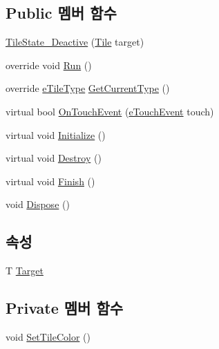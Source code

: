 \subsection*{Public 멤버 함수}
\begin{DoxyCompactItemize}
\item 
\hyperlink{class_tile_1_1_tile_state___deactive_af238bc1bded3aea43c93b71f4428d8e5}{Tile\+State\+\_\+\+Deactive} (\hyperlink{class_tile}{Tile} target)
\item 
override void \hyperlink{class_tile_1_1_tile_state___deactive_a806c5dbc5eb43903ad41d448f3d25c61}{Run} ()
\item 
override \hyperlink{_tile_8cs_a271bc07be325bca511bcb747e0ff2fda}{e\+Tile\+Type} \hyperlink{class_tile_1_1_tile_state___deactive_a1aed8e0336e11dcb55cb598119c53eda}{Get\+Current\+Type} ()
\item 
virtual bool \hyperlink{class_tile_1_1_tile_state_a8687f7cb0e2c1a436c5ac395f4f6d07a}{On\+Touch\+Event} (\hyperlink{_touch_manager_8cs_ae33e321a424fe84ba8b2fdb81ad40a68}{e\+Touch\+Event} touch)
\item 
virtual void \hyperlink{class_m_c_n_1_1_state_a8eabaffe047e6dccd5c5d8aed7bf218a}{Initialize} ()
\item 
virtual void \hyperlink{class_m_c_n_1_1_state_a32af22a6a0a979d3b3a80225426aa839}{Destroy} ()
\item 
virtual void \hyperlink{class_m_c_n_1_1_state_a6de4f94b23916fcd05f589759da9ac3f}{Finish} ()
\item 
void \hyperlink{class_m_c_n_1_1_state_a6c53b2eda47e718ff469fd76a95cf02a}{Dispose} ()
\end{DoxyCompactItemize}
\subsection*{속성}
\begin{DoxyCompactItemize}
\item 
T \hyperlink{class_m_c_n_1_1_state_a93ba2fd920292031bd6e65b1dc505cb3}{Target}
\end{DoxyCompactItemize}
\subsection*{Private 멤버 함수}
\begin{DoxyCompactItemize}
\item 
void \hyperlink{class_tile_1_1_tile_state___deactive_ac0b9d7d4a64b2c320eeb2679fc6ad459}{Set\+Tile\+Color} ()
\end{DoxyCompactItemize}


